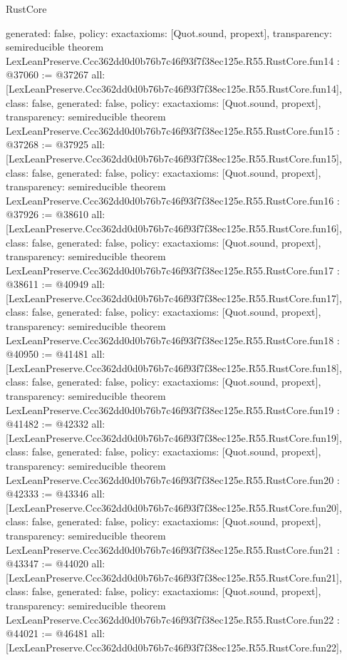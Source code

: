 \begin{lexlean}{RustCore}
\begin{coremodule}
{  generated: false,
  policy: exact{axioms: [Quot.sound, propext]},
  transparency: semireducible
}
theorem LexLeanPreserve.Ccc362dd0d0b76b7c46f93f7f38ec125e.R55.RustCore.fun14 : @37060 := @37267 {
  all: [LexLeanPreserve.Ccc362dd0d0b76b7c46f93f7f38ec125e.R55.RustCore.fun14],
  class: false,
  generated: false,
  policy: exact{axioms: [Quot.sound, propext]},
  transparency: semireducible
}
theorem LexLeanPreserve.Ccc362dd0d0b76b7c46f93f7f38ec125e.R55.RustCore.fun15 : @37268 := @37925 {
  all: [LexLeanPreserve.Ccc362dd0d0b76b7c46f93f7f38ec125e.R55.RustCore.fun15],
  class: false,
  generated: false,
  policy: exact{axioms: [Quot.sound, propext]},
  transparency: semireducible
}
theorem LexLeanPreserve.Ccc362dd0d0b76b7c46f93f7f38ec125e.R55.RustCore.fun16 : @37926 := @38610 {
  all: [LexLeanPreserve.Ccc362dd0d0b76b7c46f93f7f38ec125e.R55.RustCore.fun16],
  class: false,
  generated: false,
  policy: exact{axioms: [Quot.sound, propext]},
  transparency: semireducible
}
theorem LexLeanPreserve.Ccc362dd0d0b76b7c46f93f7f38ec125e.R55.RustCore.fun17 : @38611 := @40949 {
  all: [LexLeanPreserve.Ccc362dd0d0b76b7c46f93f7f38ec125e.R55.RustCore.fun17],
  class: false,
  generated: false,
  policy: exact{axioms: [Quot.sound, propext]},
  transparency: semireducible
}
theorem LexLeanPreserve.Ccc362dd0d0b76b7c46f93f7f38ec125e.R55.RustCore.fun18 : @40950 := @41481 {
  all: [LexLeanPreserve.Ccc362dd0d0b76b7c46f93f7f38ec125e.R55.RustCore.fun18],
  class: false,
  generated: false,
  policy: exact{axioms: [Quot.sound, propext]},
  transparency: semireducible
}
theorem LexLeanPreserve.Ccc362dd0d0b76b7c46f93f7f38ec125e.R55.RustCore.fun19 : @41482 := @42332 {
  all: [LexLeanPreserve.Ccc362dd0d0b76b7c46f93f7f38ec125e.R55.RustCore.fun19],
  class: false,
  generated: false,
  policy: exact{axioms: [Quot.sound, propext]},
  transparency: semireducible
}
theorem LexLeanPreserve.Ccc362dd0d0b76b7c46f93f7f38ec125e.R55.RustCore.fun20 : @42333 := @43346 {
  all: [LexLeanPreserve.Ccc362dd0d0b76b7c46f93f7f38ec125e.R55.RustCore.fun20],
  class: false,
  generated: false,
  policy: exact{axioms: [Quot.sound, propext]},
  transparency: semireducible
}
theorem LexLeanPreserve.Ccc362dd0d0b76b7c46f93f7f38ec125e.R55.RustCore.fun21 : @43347 := @44020 {
  all: [LexLeanPreserve.Ccc362dd0d0b76b7c46f93f7f38ec125e.R55.RustCore.fun21],
  class: false,
  generated: false,
  policy: exact{axioms: [Quot.sound, propext]},
  transparency: semireducible
}
theorem LexLeanPreserve.Ccc362dd0d0b76b7c46f93f7f38ec125e.R55.RustCore.fun22 : @44021 := @46481 {
  all: [LexLeanPreserve.Ccc362dd0d0b76b7c46f93f7f38ec125e.R55.RustCore.fun22],
}
\end{coremodule}
\end{lexlean}
